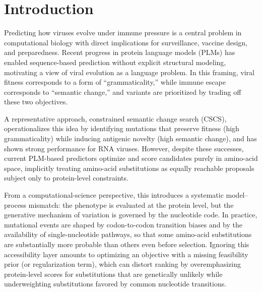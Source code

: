 \documentclass[pdflatex,sn-nature]{sn-jnl}
\begin{document}
\maketitle











\section*{Introduction}

Predicting how viruses evolve under immune pressure is a central problem in computational biology with direct implications for surveillance, vaccine design, and preparedness. Recent progress in protein language models (PLMs) has enabled sequence-based prediction without explicit structural modeling, motivating a view of viral evolution as a language problem. In this framing, viral fitness corresponds to a form of “grammaticality,” while immune escape corresponds to “semantic change,” and variants are prioritized by trading off these two objectives.

A representative approach, constrained semantic change search (CSCS), operationalizes this idea by identifying mutations that preserve fitness (high grammaticality) while inducing antigenic novelty (high semantic change), and has shown strong performance for RNA viruses. However, despite these successes, current PLM-based predictors optimize and score candidates purely in amino-acid space, implicitly treating amino-acid substitutions as equally reachable proposals subject only to protein-level constraints.

From a computational-science perspective, this introduces a systematic model–process mismatch: the phenotype is evaluated at the protein level, but the generative mechanism of variation is governed by the nucleotide code. In practice, mutational events are shaped by codon-to-codon transition biases and by the availability of single-nucleotide pathways, so that some amino-acid substitutions are substantially more probable than others even before selection. Ignoring this accessibility layer amounts to optimizing an objective with a missing feasibility prior (or regularization term), which can distort ranking by overemphasizing protein-level scores for substitutions that are genetically unlikely while underweighting substitutions favored by common nucleotide transitions.
\end{document}
